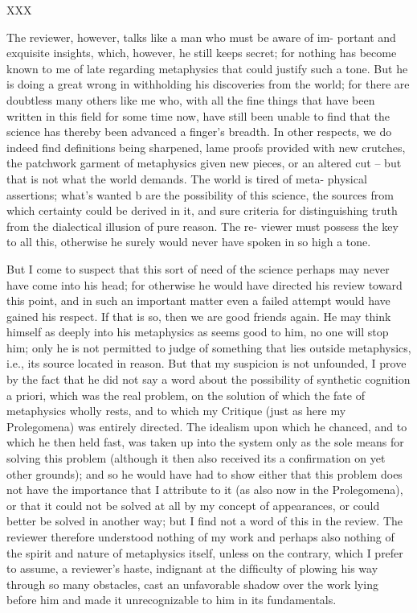 XXX

The reviewer, however, talks like a man who must be aware of im-
portant and exquisite insights, which, however, he still keeps secret; for
nothing has become known to me of late regarding metaphysics that
could justify such a tone. But he is doing a great wrong in withholding
his discoveries from the world; for there are doubtless many others like
me who, with all the ﬁne things that have been written in this ﬁeld for
some time now, have still been unable to ﬁnd that the science has thereby
been advanced a ﬁnger’s breadth. In other respects, we do indeed ﬁnd
deﬁnitions being sharpened, lame proofs provided with new crutches,
the patchwork garment of metaphysics given new pieces, or an altered
cut – but that is not what the world demands. The world is tired of meta-
physical assertions; what’s wanted b are the possibility of this science, the
sources from which certainty could be derived in it, and sure criteria for
distinguishing truth from the dialectical illusion of pure reason. The re-
viewer must possess the key to all this, otherwise he surely would never
have spoken in so high a tone.

But I come to suspect that this sort of need of the science perhaps may
never have come into his head; for otherwise he would have directed his
review toward this point, and in such an important matter even a failed
attempt would have gained his respect. If that is so, then we are good
friends again. He may think himself as deeply into his metaphysics as
seems good to him, no one will stop him; only he is not permitted to
judge of something that lies outside metaphysics, i.e., its source located
in reason. But that my suspicion is not unfounded, I prove by the fact
that he did not say a word about the possibility of synthetic cognition
a priori, which was the real problem, on the solution of which the fate
of metaphysics wholly rests, and to which my Critique (just as here my
Prolegomena) was entirely directed. The idealism upon which he chanced,
and to which he then held fast, was taken up into the system only as the
sole means for solving this problem (although it then also received its a
conﬁrmation on yet other grounds); and so he would have had to show
either that this problem does not have the importance that I attribute
to it (as also now in the Prolegomena), or that it could not be solved at
all by my concept of appearances, or could better be solved in another
way; but I ﬁnd not a word of this in the review. The reviewer therefore
understood nothing of my work and perhaps also nothing of the spirit
and nature of metaphysics itself, unless on the contrary, which I prefer to
assume, a reviewer’s haste, indignant at the difﬁculty of plowing his way
through so many obstacles, cast an unfavorable shadow over the work
lying before him and made it unrecognizable to him in its fundamentals.


